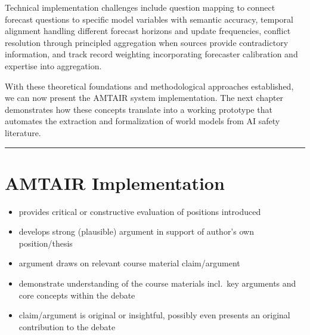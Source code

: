 \documentclass[
  11pt,
  letterpaper,
]{book}
\providecommand{\tightlist}{%
  \setlength{\itemsep}{0pt}\setlength{\parskip}{0pt}}
\begin{document}
Technical implementation challenges include question mapping to connect
forecast questions to specific model variables with semantic accuracy,
temporal alignment handling different forecast horizons and update
frequencies, conflict resolution through principled aggregation when
sources provide contradictory information, and track record weighting
incorporating forecaster calibration and expertise into aggregation.

With these theoretical foundations and methodological approaches
established, we can now present the AMTAIR system implementation. The
next chapter demonstrates how these concepts translate into a working
prototype that automates the extraction and formalization of world
models from AI safety literature.

\begin{center}\rule{0.5\linewidth}{0.5pt}\end{center}


\chapter{AMTAIR Implementation}\label{sec-amtair-implementation}

\begin{tcolorbox}[enhanced jigsaw, bottomrule=.15mm, title=\textcolor{quarto-callout-note-color}{\faInfo}\hspace{0.5em}{20\% of Grade: \textasciitilde{} 29\% of text \textasciitilde{} 8700
words \textasciitilde{} 20 pages}, opacityback=0, arc=.35mm, breakable, toptitle=1mm, toprule=.15mm, colframe=quarto-callout-note-color-frame, bottomtitle=1mm, rightrule=.15mm, opacitybacktitle=0.6, left=2mm, titlerule=0mm, leftrule=.75mm, colback=white, colbacktitle=quarto-callout-note-color!10!white, coltitle=black]

\begin{itemize}
\tightlist
\item
  provides critical or constructive evaluation of positions introduced
\item
  develops strong (plausible) argument in support of author's own
  position/thesis
\item
  argument draws on relevant course material claim/argument
\item
  demonstrate understanding of the course materials incl.~key arguments
  and core concepts within the debate
\item
  claim/argument is original or insightful, possibly even presents an
  original contribution to the debate
\end{itemize}

\end{tcolorbox}
\end{document}
